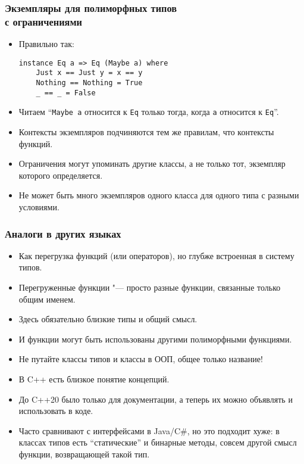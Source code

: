 \documentclass[10pt]{beamer}
\begin{document}
\begin{frame}[fragile]
  \frametitle{Экземпляры для полиморфных типов \\с ограничениями}
  \begin{itemize}
    \item Правильно так:
          \begin{lstlisting}
instance Eq a => Eq (Maybe a) where
    Just x == Just y = x == y
    Nothing == Nothing = True
    _ == _ = False
\end{lstlisting}
    \item Читаем \enquote{\lstinline|Maybe a| относится к \lstinline|Eq| только тогда, когда \lstinline|a| относится к \lstinline|Eq|}.
    \item Контексты экземпляров подчиняются тем же правилам, что контексты функций.
    \item Ограничения могут упоминать другие классы, а не только тот, экземпляр которого определяется.
    \item Не может быть много экземпляров одного класса для одного типа с разными условиями.
  \end{itemize}
\end{frame}

\begin{frame}[fragile]
  \frametitle{Аналоги в других языках}
  \begin{itemize}
    \item Как перегрузка функций (или операторов), но глубже встроенная в систему типов.
    \item Перегруженные функции "--- просто разные функции, связанные только общим именем.
    \item Здесь обязательно близкие типы и общий смысл.
    \item И функции могут быть использованы другими полиморфными функциями. \pause
    \item Не путайте классы типов и классы в ООП, общее только название!
    \item В C++ есть близкое понятие концепций. \pause
    \item До C++20 было только для документации, а теперь их можно объявлять и использовать в коде. \pause
    \item Часто сравнивают с интерфейсами в Java/C\#, но это подходит хуже: \pause в классах типов есть \enquote{статические} и бинарные методы, совсем другой смысл функции, возвращающей такой тип.
  \end{itemize}
\end{frame}
\end{document}
